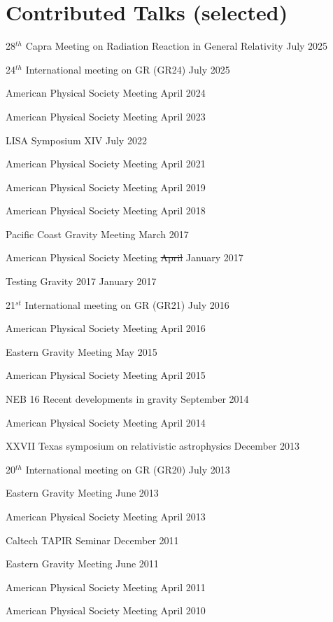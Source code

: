 \section{Contributed Talks (selected)}
\secstartswithlist{}%
\begin{etaremune}
\item
  28$^{th}$ Capra Meeting on Radiation Reaction in General Relativity
  \hfill{}
  July 2025
\item
  24$^{th}$ International meeting on GR (GR24)
  \hfill{}
  July 2025
\item
  American Physical Society Meeting
  \hfill{}
  April 2024
\item
  American Physical Society Meeting
  \hfill{}
  April 2023
\item
  LISA Symposium XIV
  \hfill{}
  July 2022
\item
  American Physical Society Meeting
  \hfill{}
  April 2021
\item
  American Physical Society Meeting
  \hfill{}
  April 2019
\item
  American Physical Society Meeting
  \hfill{}
  April 2018
\item
  Pacific Coast Gravity Meeting
  \hfill{}
  March 2017
\item
  American Physical Society Meeting
  \hfill{}
  \sout{April} January 2017
\item
  Testing Gravity 2017
  \hfill{}
  January 2017
\item
  21$^{st}$ International meeting on GR (GR21)
  \hfill{}
  July 2016
\item
  American Physical Society Meeting
  \hfill{}
  April 2016
\item
  Eastern Gravity Meeting
  \hfill{}
  May 2015
\item
  American Physical Society Meeting
  \hfill{}
  April 2015
\item
  NEB 16 Recent developments in gravity
  \hfill{}
  September 2014
\item
  American Physical Society Meeting
  \hfill{}
  April 2014
\item
  XXVII Texas symposium on relativistic astrophysics
  \hfill{}
  December 2013
\item
  20$^{th}$ International meeting on GR (GR20)
  \hfill{}
  July 2013
\item
  Eastern Gravity Meeting
  \hfill{}
  June 2013
\item
  American Physical Society Meeting
  \hfill{}
  April 2013
\item
  Caltech TAPIR Seminar
  \hfill{}
  December 2011
\item
  Eastern Gravity Meeting
  \hfill{}
  June 2011
\item
  American Physical Society Meeting
  \hfill{}
  April 2011
\item
  American Physical Society Meeting
  \hfill{}
  April 2010
\end{etaremune}


